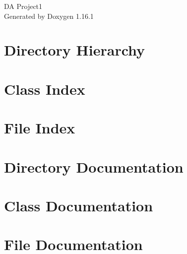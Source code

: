 \documentclass[twoside]{book}
\newcommand{\+}{\discretionary{\mbox{\scriptsize$\hookleftarrow$}}{}{}}
\newcommand{\clearemptydoublepage}{%
    \newpage{\pagestyle{empty}\cleardoublepage}%
  }
\begin{document}
  \raggedbottom
    \hypersetup{pageanchor=false,
                bookmarksnumbered=true,
                pdfencoding=unicode
               }
  \begin{titlepage}
  \vspace*{7cm}
  \begin{center}%
  {\Large DA Project1}\\
  \vspace*{1cm}
  {\large Generated by Doxygen 1.16.1}\\
  \end{center}
  \end{titlepage}
  \clearemptydoublepage
  \tableofcontents
  \clearemptydoublepage
  \hypersetup{pageanchor=true}
\chapter{Directory Hierarchy}

\chapter{Class Index}

\chapter{File Index}

\chapter{Directory Documentation}

\chapter{Class Documentation}








\chapter{File Documentation}














  \backmatter
  \newpage
  \clearemptydoublepage
  \printindex
\end{document}

